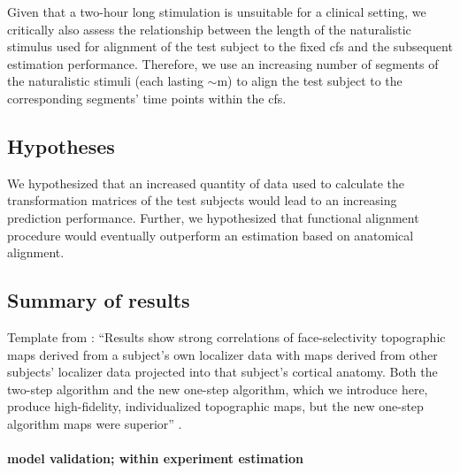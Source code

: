 Given that a two-hour long stimulation is unsuitable for a clinical setting, we
critically also assess the relationship between the length of the naturalistic
stimulus used for alignment of the test subject to the fixed \ac{cfs} and the
subsequent estimation performance.
%
Therefore, we use an increasing number of segments of the naturalistic stimuli
(each lasting $\sim$\unit[15]{m}) to align the test subject to the corresponding
segments' time points within the \ac{cfs}.


\subsection{Hypotheses}

%
We hypothesized that an increased quantity of data used to calculate the
transformation matrices of the test subjects would lead to an increasing
prediction performance.
%
Further, we hypothesized that functional alignment procedure would eventually
outperform an estimation based on anatomical alignment.


\subsection{Summary of results}



%
Template from \citet{jiahui2020predicting}: ``Results show strong correlations
of face-selectivity topographic maps derived from a subject's own localizer data
with maps derived from other subjects' localizer data projected into that
subject's cortical anatomy. Both the two-step algorithm and the new one-step
algorithm, which we introduce here, produce high-fidelity, individualized
topographic maps, but the new one-step algorithm maps were superior''
\citep{jiahui2020predicting}.


\paragraph{model validation; within experiment estimation}


